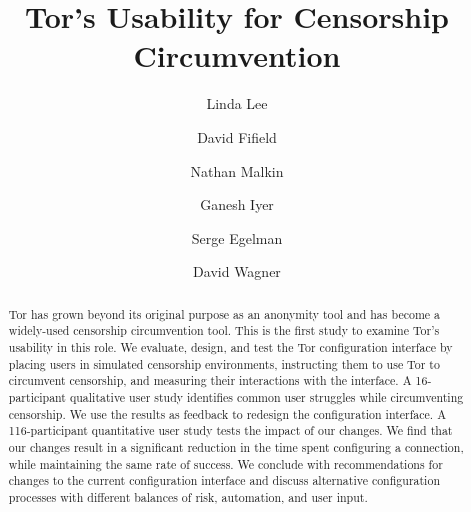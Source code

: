 \documentclass[USenglish,oneside,twocolumn]{article}
\begin{document}
 
  \author*[1]{Linda Lee}

  \author[2]{David Fifield}

  \author[3]{Nathan Malkin}

  \author[4]{Ganesh Iyer}

  \author[5]{Serge Egelman}
  
  \author[6]{David Wagner}




  
   

  \title{\huge Tor's Usability for Censorship Circumvention}



  \begin{abstract}
{Tor has grown beyond its original purpose as an anonymity tool and has 
become a widely-used censorship circumvention tool.
This is the first study to examine Tor's usability in this role.
We evaluate, design, and test the Tor configuration interface by
placing users in simulated censorship environments, instructing them to use Tor
to circumvent censorship, and measuring their interactions with the interface.
A 16-participant qualitative user study identifies common user struggles while circumventing censorship.
We use the results as feedback to redesign the configuration interface.
A 116-participant quantitative user study tests the impact of our changes.
We find that our changes result in a significant reduction 
in the time spent configuring a connection, while maintaining the same rate of success. We
conclude with recommendations for changes to the current configuration interface and discuss
alternative configuration processes with different balances of risk, automation, and user input.}
\end{abstract}
\end{document}
